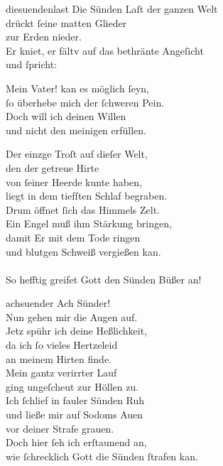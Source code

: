 \documentclass[tocstyle=ref-genre]{ees}
\begin{document}
{\begin{movement}{diesuendenlast}
  Die Sünden Laſt der ganzen Welt\\
  drückt ſeine matten Glieder\\
  zur Erden nieder.\\
  Er kniet, er fältv
  auf das bethränte Angeſicht\\
  und ſpricht:

  Mein Vater! kan es möglich ſeyn,\\
  ſo überhebe mich der ſchweren Pein.\\
  Doch will ich deinen Willen\\
  und nicht den meinigen erfüllen.

  Der einzge Troſt auf dieſer Welt,\\
  den der getreue Hirte\\
  von ſeiner Heerde kunte haben,\\
  liegt in dem tiefſten Schlaf begraben.\\
  Drum öffnet ſich das Himmels Zelt.\\
  Ein Engel muß ihm Stärkung bringen,\\
  damit Er mit dem Tode ringen\\
  und blutgen Schweiß vergießen kan.\\\\
  So hefftig greifet Gott den Sünden Büßer an!
\end{movement}

\begin{movement}{achsuender}
  Ach Sünder!\\
  Nun gehen mir die Augen auf.\\
  Jetz spühr ich deine Heßlichkeit,\\
  da ich ſo vieles Hertzeleid\\
  an meinem Hirten finde.\\
  Mein gantz verirrter Lauf\\
  ging ungeſcheut zur Höllen zu.\\
  Ich ſchlief in fauler Sünden Ruh\\
  und ließe mir auf Sodoms Auen\\
  vor deiner Strafe grauen.\\
  Doch hier ſeh ich erſtaunend an,\\
  wie ſchrecklich Gott die Sünden ſtrafen kan.
\end{movement}

}
\end{document}
